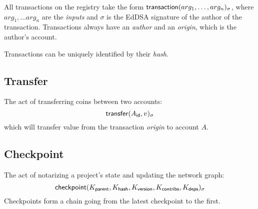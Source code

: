 All transactions on the registry take the form $\mathsf{transaction}\lparen arg_1, \ldots,
arg_n\rparen_\sigma$, where $arg_1, \ldots arg_n$ are the \emph{inputs} and $\sigma$ is the
\textsf{EdDSA} signature of the author of the transaction. Transactions
always have an \emph{author} and an \emph{origin}, which is the author's account.

Transactions can be uniquely identified by their \emph{hash}.

\subsection{Transfer}
The act of transferring coins between two accounts:
\[
    \mathsf{transfer}\lparen A_{\mathsf{id}}, v\rparen_\sigma
\]
which will transfer value from the transaction \emph{origin} to account $A$.


\subsection{Checkpoint}
\label{s:checkpoint}
The act of notarizing a project's state and updating the network graph:
\[
    \mathsf{checkpoint}\lparen K_{\mathsf{parent}}, K_{\mathsf{hash}}, K_{\mathsf{version}},
    K_{\mathsf{contribs}}, K_{\mathsf{deps}}\rparen_\sigma
\]
Checkpoints form a chain going from the latest checkpoint to the first.

